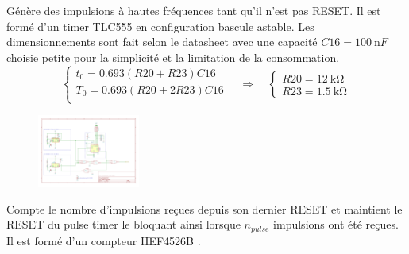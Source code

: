 \documentclass[french]{layout/Report}
\begin{document}
\begin{description}[leftmargin=!,labelwidth=3cm, labelindent=\parindent]
	\item[Pulse timer] Génère des impulsions à hautes fréquences tant qu'il n'est pas RESET. Il est formé d'un timer TLC555 en configuration bascule astable. Les dimensionnements sont fait selon le datasheet \cite{TLC555} avec une capacité $\mathit{C16} = \SI{100}{\nano F}$ choisie petite pour la simplicité et la limitation de la consommation.
		\begin{equation*}
			\begin{cases}
				t_0 = 0.693(\mathit{R20}+\mathit{R23})\mathit{C16} \\
				T_0 = 0.693(\mathit{R20}+2\mathit{R23})\mathit{C16} \\
			\end{cases}
			\quad\Rightarrow\quad
			\begin{cases}
				\mathit{R20} = \SI{12}{\kilo\ohm} \\
				\mathit{R23} = \SI{1.5}{\kilo\ohm}
			\end{cases}
		\end{equation*}

        \begin{figure}[H]
        \centering
        \includegraphics[width=0.3\textwidth]{fig/pulse_timer.pdf}
        \end{figure}

	\item[Down counter] Compte le nombre d'impulsions reçues depuis son dernier RESET et maintient le RESET du pulse timer le bloquant ainsi lorsque $n_{pulse}$ impulsions ont été reçues. Il est formé d'un compteur HEF4526B \cite{HEF4526B}.


\end{description}
\end{document}
